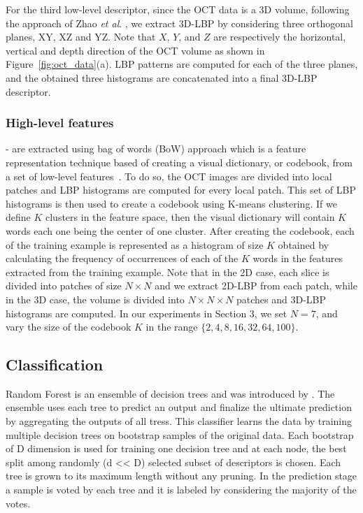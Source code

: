 For the third low-level descriptor, since the OCT data is a 3D volume, following the approach of Zhao \textit{et al}. \cite{zhao2007dynamic}, we extract 3D-LBP by considering three orthogonal planes, XY, XZ and YZ. Note that $X$, $Y$, and $Z$ are respectively the horizontal, vertical and depth direction of the OCT volume as shown in Figure~\ref{fig:oct_data}(a).
LBP patterns are computed for each of the three planes, and the obtained three histograms are concatenated into a final 3D-LBP descriptor.



\subsubsection{High-level features} - are extracted using bag of words (BoW) approach which is a feature representation technique based of creating a visual dictionary, or codebook, from a set of low-level features~\cite{Sivic2003}. 
To do so, the OCT images are divided into local patches and LBP histograms are computed for every local patch.
This set of LBP histograms is then used to create a codebook using K-means clustering. If we define $K$ clusters in the feature space, then the visual dictionary will contain $K$ words each one being the center of one cluster.
After creating the codebook, each of the training example is represented as a histogram of size $K$ obtained by calculating the frequency of occurrences of each of the $K$ words in the features extracted from the training example. 
Note that in the 2D case, each slice is divided into patches of size $N\times N$ and we extract 2D-LBP from each patch, while in the 3D case, the volume is divided into $N \times N \times N$ patches and 3D-LBP histograms are computed. In our experiments in Section 3, we set $N=7$, and vary the size of the codebook $K$ in the range $\{2, 4, 8, 16, 32, 64, 100 \}$.
% 

\subsection{Classification}

Random Forest is an ensemble of decision trees and was introduced by \cite{breiman2001random}.
The ensemble uses each tree to predict an output and finalize the ultimate
prediction by aggregating the outputs of all tress. This classifier learns the
data by training multiple decision trees on bootstrap samples of the original
data. Each bootstrap of D dimension is used for training one decision tree
and at each node, the best split among randomly (d << D) selected subset
of descriptors is chosen. Each tree is grown to its maximum length without
any pruning. In the prediction stage a sample is voted by each tree and it is
labeled by considering the majority of the votes.


